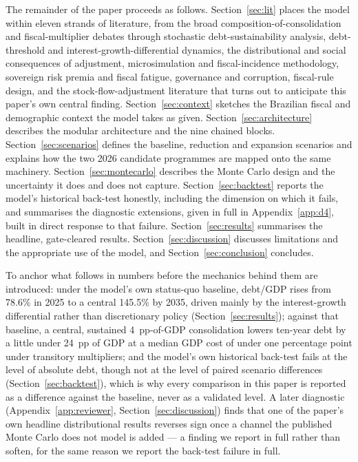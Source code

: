 \documentclass[11pt,a4paper]{article}
\begin{document}
The remainder of the paper proceeds as follows. Section~\ref{sec:lit} places the model within eleven strands of literature, from the broad composition-of-consolidation and fiscal-multiplier debates through stochastic debt-sustainability analysis, debt-threshold and interest-growth-differential dynamics, the distributional and social consequences of adjustment, microsimulation and fiscal-incidence methodology, sovereign risk premia and fiscal fatigue, governance and corruption, fiscal-rule design, and the stock-flow-adjustment literature that turns out to anticipate this paper's own central finding. Section~\ref{sec:context} sketches the Brazilian fiscal and demographic context the model takes as given. Section~\ref{sec:architecture} describes the modular architecture and the nine chained blocks. Section~\ref{sec:scenarios} defines the baseline, reduction and expansion scenarios and explains how the two 2026 candidate programmes are mapped onto the same machinery. Section~\ref{sec:montecarlo} describes the Monte Carlo design and the uncertainty it does and does not capture. Section~\ref{sec:backtest} reports the model's historical back-test honestly, including the dimension on which it fails, and summarises the diagnostic extensions, given in full in Appendix~\ref{app:d4}, built in direct response to that failure. Section~\ref{sec:results} summarises the headline, gate-cleared results. Section~\ref{sec:discussion} discusses limitations and the appropriate use of the model, and Section~\ref{sec:conclusion} concludes.

To anchor what follows in numbers before the mechanics behind them are introduced: under the model's own status-quo baseline, debt/GDP rises from 78.6\% in 2025 to a central 145.5\% by 2035, driven mainly by the interest-growth differential rather than discretionary policy (Section~\ref{sec:results}); against that baseline, a central, sustained 4~pp-of-GDP consolidation lowers ten-year debt by a little under 24~pp of GDP at a median GDP cost of under one percentage point under transitory multipliers; and the model's own historical back-test fails at the level of absolute debt, though not at the level of paired scenario differences (Section~\ref{sec:backtest}), which is why every comparison in this paper is reported as a difference against the baseline, never as a validated level. A later diagnostic (Appendix~\ref{app:reviewer}, Section~\ref{sec:discussion}) finds that one of the paper's own headline distributional results reverses sign once a channel the published Monte Carlo does not model is added --- a finding we report in full rather than soften, for the same reason we report the back-test failure in full.
\end{document}
